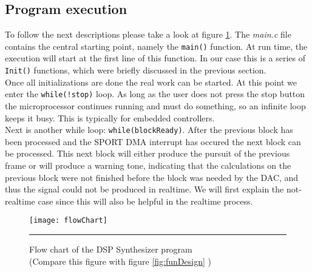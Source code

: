 \subsection{Program execution}
To follow the next descriptions please take a look at figure \ref{fig:flowChart}. The \emph{main.c} file contains the central starting point, namely the \verb+main()+ function. At run time, the execution will start at the first line of this function. In our case this is a series of \verb+Init()+ functions, which were briefly discussed in the previous section.\\
Once all initializations are done the real work can be started. At this point we enter the \verb+while(!stop)+ loop. As long as the user does not press the stop button the microprocessor continues running and must do something, so an infinite loop keeps it busy. This is typically for embedded controllers.\\ Next is another while loop: \verb+while(blockReady)+. After the previous block has been processed and the SPORT DMA interrupt has occured the next block can be processed. This next block will either produce the pursuit of the previous frame or will produce a warning tone, indicating that the calculations on the previous block were not finished before the block was needed by the DAC, and thus the signal could not be produced in realtime. We will first explain the not-realtime case since this will also be helpful in the realtime process.
\begin{figure}[htbp]
\centering
\texttt{[image: flowChart]}
\rule{30em}{0.5pt}
\caption[Flow chart of the DSP Synthesizer program]{Flow chart of the DSP Synthesizer program\\(Compare this figure with figure \ref{fig:funDesign} ) }
\label{fig:flowChart}
\end{figure}\\
